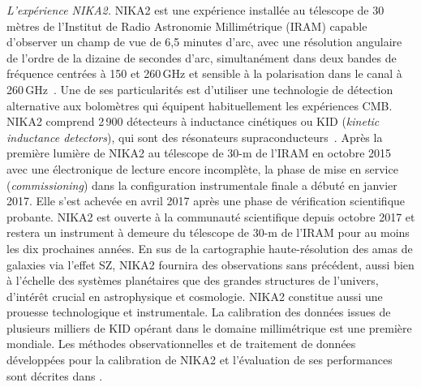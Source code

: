 \emph{L'expérience NIKA2.} NIKA2 est une expérience installée au
télescope de 30 mètres de l'Institut de Radio Astronomie Millimétrique
(IRAM) capable d'observer un champ de vue de 6,5 minutes d'arc, avec
une résolution angulaire de l'ordre de la dizaine de secondes d'arc,
simultanément dans deux bandes de fréquence centrées à 150 et
260\,GHz et sensible à la polarisation dans le canal à
260\,GHz~. Une de ses particularités est
d'utiliser une technologie de détection alternative aux bolomètres qui
équipent habituellement les expériences CMB. NIKA2 comprend 2\,900
détecteurs à inductance cinétiques ou KID (\emph{kinetic inductance
detectors}), qui sont des résonateurs
supraconducteurs~. Après la première lumière de NIKA2 au
télescope de 30-m de l'IRAM en octobre 2015 avec une électronique de
lecture encore incomplète, la phase de mise en service
(\emph{commissioning}) dans la configuration instrumentale finale a
débuté en janvier 2017. Elle s'est achevée en avril 2017 après une
phase de vérification scientifique probante. NIKA2 est ouverte à la
communauté scientifique depuis octobre 2017 et restera un instrument à
demeure du télescope de 30-m de l'IRAM pour au moins les dix
prochaines années. En sus de la cartographie haute-résolution des amas
de galaxies via l'effet SZ, NIKA2 fournira des observations sans
précédent, aussi bien à l'échelle des systèmes planétaires que des
grandes structures de l'univers, d'intérêt crucial en astrophysique et
cosmologie. NIKA2 constitue aussi une prouesse technologique et
instrumentale. La calibration des données issues de plusieurs milliers
de KID opérant dans le domaine millimétrique est une première
mondiale. Les méthodes observationnelles et de traitement de données
développées pour la calibration de NIKA2 et l'évaluation de ses
performances sont décrites dans .\\


